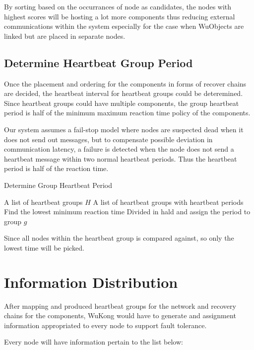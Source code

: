 By sorting based on the occurrances of node as candidates, the nodes with
highest scores will be hosting a lot more components thus reducing external
communications within the system especially for the case when WuObjects are
linked but are placed in separate nodes.

\subsection{Determine Heartbeat Group Period}

Once the placement and ordering for the components in forms of recover chains
are decided, the heartbeat interval for heartbeat groups could be deteremined.
Since heartbeat groups could have multiple components, the group heartbeat
period is half of the minimum maximum reaction time policy of the components.

Our system assumes a fail-stop model where nodes are suspected dead when it
does not send out messages, but to compensate possible deviation in
communication latency, a failure is detected when the node does not send
a heartbeat message within two normal heartbeat periods. Thus the heartbeat
period is half of the reaction time.

\begin{algorithm}
\caption{Determine Group Heartbeat Period}
\label{alg:determine-group-heartbeat-period}
\begin{algorithmic}
\Require A list of heartbeat groups $H$
\Ensure A list of heartbeat groups with heartbeat periods
    \State Find the lowest minimum reaction time
    \State Divided in hald and assign the period to group $g$
  \EndFor
\EndFor
\end{algorithmic}
\end{algorithm}

Since all nodes within the heartbeat group is compared against, so only the
lowest time will be picked.

\section{Information Distribution}

After mapping and produced heartbeat groups for the network and recovery chains
for the components, WuKong would have to generate and assignment information
appropriated to every node to support fault tolerance.

Every node will have information pertain to the list below:

